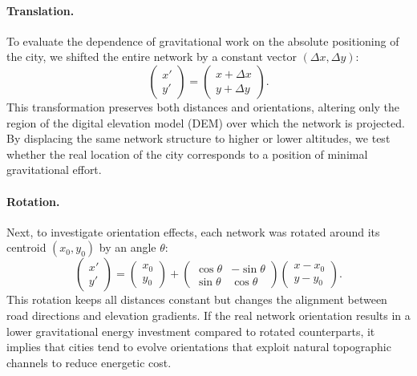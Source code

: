 \documentclass[twocolumn,amsmath,amssymb,floatfix,nature,shownopacs,footinbib,superscriptaddress]{revtex4-1} %
\begin{document}
\paragraph*{Translation.}
To evaluate the dependence of gravitational work on the absolute positioning of the city, we shifted the entire network by a constant vector $(\Delta x, \Delta y)$:
\[
\begin{pmatrix} x' \\[3pt] y' \end{pmatrix} =
\begin{pmatrix} x + \Delta x \\[3pt] y + \Delta y \end{pmatrix}.
\]
This transformation preserves both distances and orientations, altering only the region of the digital elevation model (DEM) over which the network is projected. 
By displacing the same network structure to higher or lower altitudes, we test whether the real location of the city corresponds to a position of minimal gravitational effort.

\paragraph*{Rotation.}
Next, to investigate orientation effects, each network was rotated around its centroid $(x_0, y_0)$ by an angle $\theta$:
\[
\begin{pmatrix} x' \\[3pt] y' \end{pmatrix} =
\begin{pmatrix} x_0 \\[3pt] y_0 \end{pmatrix} +
\begin{pmatrix}
\cos\theta & -\sin\theta \\[3pt]
\sin\theta & \cos\theta
\end{pmatrix}
\begin{pmatrix} x - x_0 \\[3pt] y - y_0 \end{pmatrix}.
\]
This rotation keeps all distances constant but changes the alignment between road directions and elevation gradients. 
If the real network orientation results in a lower gravitational energy investment compared to rotated counterparts, it implies that cities tend to evolve orientations that exploit natural topographic channels to reduce energetic cost.
\end{document}
